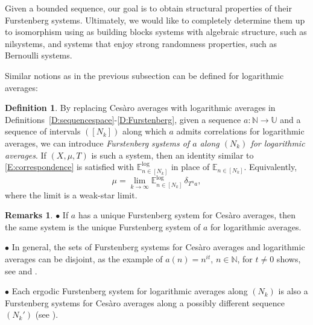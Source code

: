 \documentclass[11pt]{amsart}
\theoremstyle{definition}
\newtheorem{definition}{Definition}[section]
\newtheorem*{remarks}{Remarks}
\newcommand{\lE}{\mathbb{E}^{\log}}
\newcommand{\E}{{\mathbb E}}
\newcommand{\N}{{\mathbb N}}
\newcommand{\U}{{\mathbb U}}
\begin{document}
Given a bounded sequence, our goal is  to obtain  structural properties of their Furstenberg systems. Ultimately, we would like to  completely determine them up to isomorphism using as building blocks  systems with algebraic structure, such as nilsystems, and systems that enjoy strong randomness properties, such as Bernoulli systems.

 Similar notions as in the previous subsection  can be defined for logarithmic averages:
\begin{definition} By replacing Ces\`aro averages with logarithmic averages in  Definitions~\ref{D:sequencespace}-\ref{D:Furstenberg},
	given a sequence $a\colon \N\to \U$ and a sequence of intervals $([N_k])$ along which $a$ admits correlations for logarithmic  averages, we can introduce {\em Furstenberg systems of $a$ 	 along    $(N_k)$ for logarithmic averages}. If $(X,\mu,T)$ is such a system, then an identity similar to \eqref{E:correspondence} is satisfied with $\lE_{n\in[N_k]}$ in place of $\E_{n\in [N_k]}$. Equivalently,
	$$
	\mu=\lim_{k\to\infty}\lE_{n\in [N_k]}\,  \delta_{T^na},
	$$
	where the limit is a weak-star limit.
	\end{definition}
\begin{remarks}
	$\bullet$ If $a$ has a unique Furstenberg system for Ces\`aro averages, then the same system is the unique Furstenberg system of $a$ for logarithmic averages.
	
	$\bullet$ In general, the sets of Furstenberg systems for Ces\`aro averages and logarithmic averages can be disjoint, as the example of $a(n)=n^{it}$, $n\in\N$, for $t\neq0$ shows, see \cite[Corollary~5.5]{GLR21} and  \cite[Section~1.3]{FH21}.
	
	
	$\bullet$
	Each ergodic Furstenberg system for logarithmic averages along $(N_k)$ is also a Furstenberg systems for Ces\`aro averages along a possibly different sequence $(N_k')$ (see \cite[Corollary~2.2]{Go-Kw-Le}).
\end{remarks}
\end{document}
